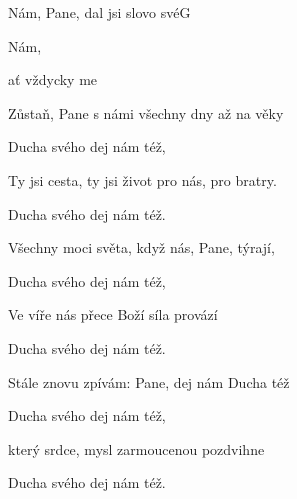 \begin{song}{Nám, Pane, dal jsi slovo své}{G}{}

\begin{SBChorus}

Nám, 

 

ať  vždycky me


\end{SBChorus}

\begin{SBVerse}

Zůstaň, Pane s námi všechny dny až na věky

Ducha svého dej nám též,

Ty jsi cesta, ty jsi život pro nás, pro bratry.

Ducha svého dej nám též.

\end{SBVerse}

\begin{SBVerse}

Všechny moci světa, když nás, Pane, týrají,

Ducha svého dej nám též,

Ve víře nás přece Boží síla provází

Ducha svého dej nám též.

\end{SBVerse}

\begin{SBVerse}

Stále znovu zpívám: Pane, dej nám Ducha též

Ducha svého dej nám též,

který srdce, mysl zarmoucenou pozdvihne

Ducha svého dej nám též.

\end{SBVerse}

\end{song}
